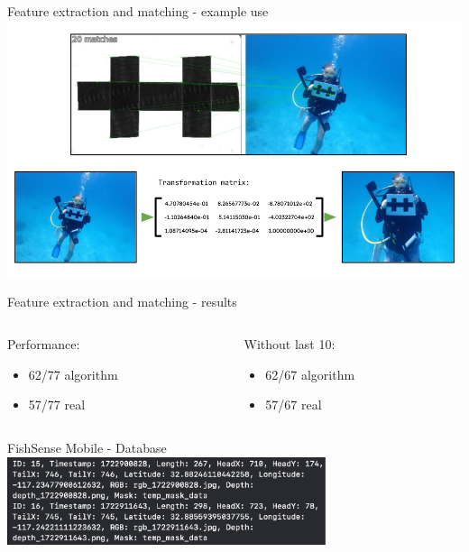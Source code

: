 \begin{frame}{Feature extraction and matching - example use}
    \centering
    \includegraphics[height=1.0\textheight,width=1.0\textwidth,keepaspectratio]{images/fs_homography_warped.png}
\end{frame}

\begin{frame}{Feature extraction and matching - results}
    \begin{columns}
        \begin{column}{0.3\textwidth}
            Performance:
            \begin{itemize}
                \item 62/77 algorithm
                \item 57/77 real
            \end{itemize}
        \end{column}
        \begin{column}{0.3\textwidth}
            Without last 10:
            \begin{itemize}
                \item 62/67 algorithm
                \item 57/67 real
            \end{itemize}
        \end{column}
    \end{columns}
\end{frame}

\begin{frame}{FishSense Mobile - Database}
    \centering
    \includegraphics[height=0.7\textheight,width=0.7\textwidth,keepaspectratio]{images/DBLog.png}
\end{frame}

